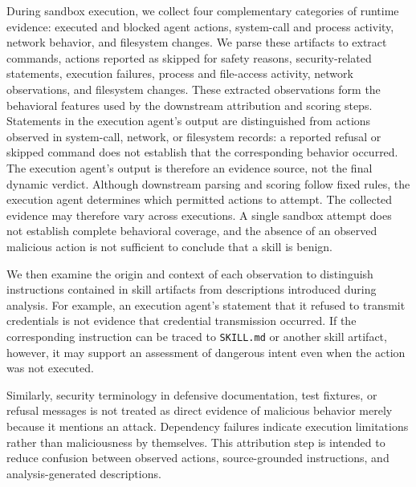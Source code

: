 During sandbox execution, we collect four complementary categories of runtime evidence:
executed and blocked agent actions, system-call and process activity, network behavior,
and filesystem changes. 
We parse these artifacts to extract commands, actions reported
as skipped for safety reasons, security-related statements,
execution failures, process and file-access activity,
network observations, and filesystem changes. These extracted
observations form the behavioral features used by the
downstream attribution and scoring steps. Statements in the
execution agent's output are distinguished from actions
observed in system-call, network, or filesystem records:
a reported refusal or skipped command does not establish
that the corresponding behavior occurred. The execution
agent's output is therefore an evidence source, not the
final dynamic verdict.
Although downstream parsing and scoring follow fixed rules,
the execution agent determines which permitted actions to
attempt. The collected evidence may therefore vary across
executions. A single sandbox attempt does not establish
complete behavioral coverage, and the absence of an observed
malicious action is not sufficient to conclude that a skill
is benign.

We then examine the origin and context of each observation
to distinguish instructions contained in skill artifacts
from descriptions introduced during analysis. For example,
an execution agent's statement that it refused to transmit
credentials is not evidence that credential transmission
occurred. If the corresponding instruction can be traced
to \texttt{SKILL.md} or another skill artifact, however,
it may support an assessment of dangerous intent even
when the action was not executed.

Similarly, security terminology in defensive documentation,
test fixtures, or refusal messages is not treated as direct
evidence of malicious behavior merely because it mentions
an attack. Dependency failures indicate execution limitations
rather than maliciousness by themselves. This attribution
step is intended to reduce confusion between observed
actions, source-grounded instructions, and analysis-generated
descriptions.

